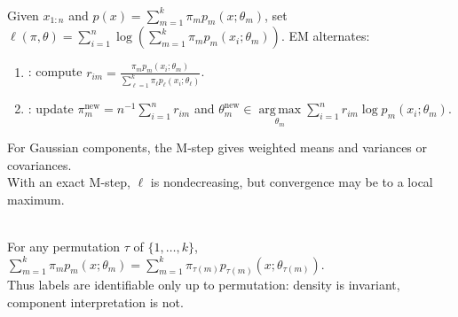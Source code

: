 \begin{method} \label{method:sl-em-algorithm} \\
Given $x_{1:n}$ and $p(x)=\sum\limits_{m=1}^k\pi_mp_m(x;\theta_m)$, set $\ell(\pi,\theta)=\sum\limits_{i=1}^n\log(\sum\limits_{m=1}^k\pi_mp_m(x_i;\theta_m))$. EM alternates:
\begin{enumerate}[label=(\roman*)]
\setlength{\itemsep}{0pt}
\item {}: compute $r_{im}=\frac{\pi_mp_m(x_i;\theta_m)}{\sum\limits_{\ell=1}^k\pi_\ell p_\ell(x_i;\theta_\ell)}$.
\item {}: update $\pi_m^{\mathrm{new}}=n^{-1}\sum\limits_{i=1}^n r_{im}$ and $\theta_m^{\mathrm{new}}\in\operatorname*{arg\,max}\limits_{\theta_m}\sum\limits_{i=1}^n r_{im}\log p_m(x_i;\theta_m)$.
\end{enumerate}
For Gaussian components, the M-step gives weighted means and variances or covariances.\\
With an exact M-step, $\ell$ is nondecreasing, but convergence may be to a local maximum.
\end{method}

\begin{remark} \label{rem:sl-clustering-identifiability} \\
For any permutation $\tau$ of $\{1,\ldots,k\}$, $\sum\limits_{m=1}^k\pi_mp_m(x;\theta_m)=\sum\limits_{m=1}^k\pi_{\tau(m)}p_{\tau(m)}(x;\theta_{\tau(m)})$.\\
Thus labels are identifiable only up to permutation: density is invariant, component interpretation is not.
\end{remark}

